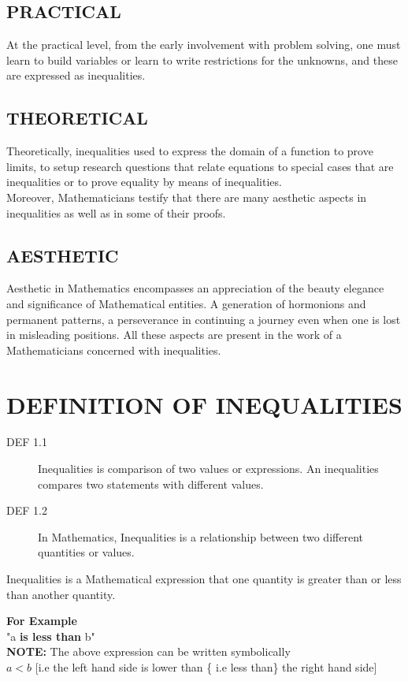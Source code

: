 \documentclass[12pt]{report}
\newcommand{\bt}[1]{\textbf{#1}}
\newcommand{\spn}[1]{\\[#1cm]}
\newcommand{\NI}{\noindent}
\begin{document}
	\subsection{PRACTICAL}
	At the practical level, from the early involvement with problem solving, one must learn to build variables or learn to write restrictions for the unknowns, and these are expressed as inequalities.
	
	\subsection{THEORETICAL}
	Theoretically, inequalities used to express the domain of a function to prove limits, to setup research questions that relate equations to special cases that are inequalities or to prove equality by means of inequalities.\spn{-.3}
	
	\NI Moreover, Mathematicians testify that there are many aesthetic aspects in inequalities as well as in some of their proofs.
	
	\subsection{AESTHETIC}
	Aesthetic in Mathematics encompasses an appreciation of the beauty elegance and significance of Mathematical entities. A generation of hormonions and permanent patterns, a perseverance in continuing a journey even when one is lost in misleading positions. All these aspects are present in the work of a Mathematicians concerned with inequalities.
	
	
	\section{DEFINITION OF INEQUALITIES}
	\begin{description}
		\item[DEF 1.1] Inequalities is comparison of two values or expressions. An inequalities compares two statements with different values.
		\item[DEF 1.2] In Mathematics, Inequalities is a relationship between two different quantities or values.
	\end{description}
	Inequalities is a Mathematical expression that one quantity is greater than or less than another quantity.
	
	\NI\bt{For Example}\\
	"a\bt{ is less than } b"\spn{-.4}
	
	\NI \bt{NOTE:} The above expression can be written symbolically\\
	$\displaystyle a < b$ [i.e the left hand side is lower than \{ i.e less than\} the right hand side]\spn{-0.3}
	
\end{document}
